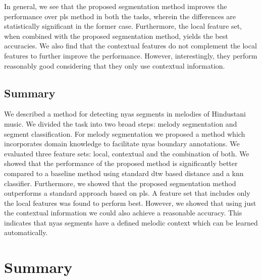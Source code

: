 {In general, we see that the proposed segmentation method improves the performance over \gls{pls} method in both the tasks, wherein the differences are statistically significant in the former case. Furthermore, the local feature set, when combined with the proposed segmentation method, yields the best accuracies. We also find that the contextual features do not complement the local features to further improve the performance. However, interestingly, they perform reasonably good considering that they only use contextual information.


\subsection{Summary}
\label{ConclusionAndFutureWork}

We described a method for detecting \gls{nyas} segments in melodies of Hindustani music. We divided the task into two broad steps: melody segmentation and segment classification. For melody segmentation we proposed a method which incorporates domain knowledge to facilitate \gls{nyas} boundary annotations. We evaluated three feature sets: local, contextual and the combination of both. We showed that the performance of the proposed method is significantly better compared to a baseline method using standard \gls{dtw} based distance and a \gls{knn} classifier. Furthermore, we showed that the proposed segmentation method outperforms a standard approach based on \gls{pls}. A feature set that includes only the local features was found to perform best. However, we showed that using just the contextual information we could also achieve a reasonable accuracy. This indicates that \gls{nyas} segments have a defined melodic context which can be learned automatically. 


\section{Summary}
\label{sec:preprocessing_summary}

}

